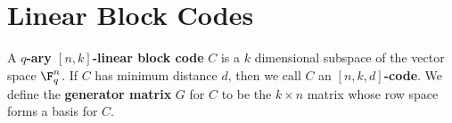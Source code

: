 \section{Linear Block Codes}

\begin{definition}
  A \textbf{$q$-ary $[n,k]$-linear block code} $C$ is a $k$ dimensional subspace
  of the vector space $\F_q^n$. If $C$ has minimum distance $d$, then we call
  $C$ an \textbf{$[n,k,d]$-code}. We define the \textbf{generator matrix} $G$
  for $C$ to be the $k \times n$ matrix whose row space forms a basis for $C$.
\end{definition}
